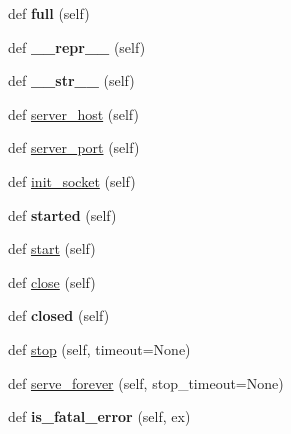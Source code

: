 \begin{DoxyCompactItemize}
\mbox{\label{classgevent_1_1baseserver_1_1_base_server_ab81f569f96ae6316d0101145ab214a0e}} 
def {\bfseries full} (self)
\item 
\mbox{\label{classgevent_1_1baseserver_1_1_base_server_a0e13fc37e087ebf33c3062249929de48}} 
def {\bfseries \+\_\+\+\_\+repr\+\_\+\+\_\+} (self)
\item 
\mbox{\label{classgevent_1_1baseserver_1_1_base_server_abfd1dd99dd7be0ed3b063a9a6cdd540b}} 
def {\bfseries \+\_\+\+\_\+str\+\_\+\+\_\+} (self)
\item 
def \hyperlink{classgevent_1_1baseserver_1_1_base_server_acf560538baab6d52108f14945c4f3538}{server\+\_\+host} (self)
\item 
def \hyperlink{classgevent_1_1baseserver_1_1_base_server_ac17f5d41ecd4c6480ea5f7e9182bf34b}{server\+\_\+port} (self)
\item 
def \hyperlink{classgevent_1_1baseserver_1_1_base_server_ae80a885199589a0bf16ba5c586ad6e7b}{init\+\_\+socket} (self)
\item 
\mbox{\label{classgevent_1_1baseserver_1_1_base_server_ae476e9b0e3bfa4caac14e8da357bbda1}} 
def {\bfseries started} (self)
\item 
def \hyperlink{classgevent_1_1baseserver_1_1_base_server_ac88d293a4794278c0c2f498b9bd2ed3a}{start} (self)
\item 
def \hyperlink{classgevent_1_1baseserver_1_1_base_server_a7a6ba0220eb15221727c629460dfceb9}{close} (self)
\item 
\mbox{\label{classgevent_1_1baseserver_1_1_base_server_a58f2fd5dd037406df0ea0665ddc2c1c4}} 
def {\bfseries closed} (self)
\item 
def \hyperlink{classgevent_1_1baseserver_1_1_base_server_a64f2dbb3a0741c2a8b7e2396175567fa}{stop} (self, timeout=None)
\item 
def \hyperlink{classgevent_1_1baseserver_1_1_base_server_a3f6e831866a64795bed63a9b9e944f03}{serve\+\_\+forever} (self, stop\+\_\+timeout=None)
\item 
\mbox{\label{classgevent_1_1baseserver_1_1_base_server_a829a94dc2edd885095e226352cca1a16}} 
def {\bfseries is\+\_\+fatal\+\_\+error} (self, ex)
\end{DoxyCompactItemize}
